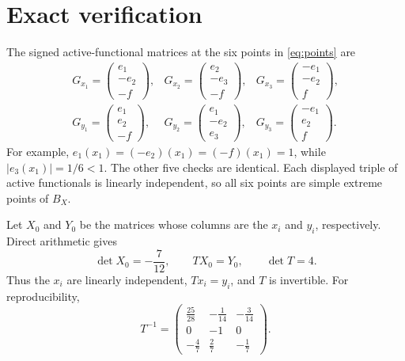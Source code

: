 \documentclass[11pt]{article}
\begin{document}
\section{Exact verification}

The signed active-functional matrices at the six points in
\eqref{eq:points} are
\begin{equation}\label{eq:Gmatrices}
\begin{array}{lll}
 G_{x_1}=\begin{pmatrix}e_1\\-e_2\\-f\end{pmatrix},&
 G_{x_2}=\begin{pmatrix}e_2\\-e_3\\-f\end{pmatrix},&
 G_{x_3}=\begin{pmatrix}-e_1\\-e_2\\f\end{pmatrix},\\[16pt]
 G_{y_1}=\begin{pmatrix}e_1\\e_2\\-f\end{pmatrix},&
 G_{y_2}=\begin{pmatrix}e_1\\-e_2\\e_3\end{pmatrix},&
 G_{y_3}=\begin{pmatrix}-e_1\\e_2\\f\end{pmatrix}.
\end{array}
\end{equation}
For example, $e_1(x_1)=(-e_2)(x_1)=(-f)(x_1)=1$, while
$|e_3(x_1)|=1/6<1$. The other five checks are identical. Each displayed
triple of active functionals is linearly independent, so all six points are
simple extreme points of $B_X$.

Let $X_0$ and $Y_0$ be the matrices whose columns are the $x_i$ and $y_i$,
respectively. Direct arithmetic gives
\begin{equation}\label{eq:basicchecks}
 \det X_0=-\frac7{12},\qquad TX_0=Y_0,\qquad \det T=4.
\end{equation}
Thus the $x_i$ are linearly independent, $Tx_i=y_i$, and $T$ is invertible.
For reproducibility,
\begin{equation}\label{eq:Tinv}
 T^{-1}=
 \begin{pmatrix}
 \frac{25}{28}&-\frac1{14}&-\frac3{14}\\
 0&-1&0\\
 -\frac47&\frac27&-\frac17
 \end{pmatrix}.
\end{equation}
\end{document}
